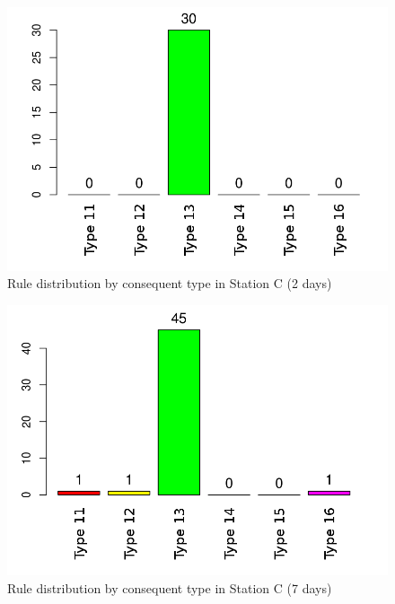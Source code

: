 \begin{figure}[hbtp]
\includegraphics[width=\textwidth]{img/conseqtypes_seg2.png}
\caption{Rule distribution by consequent type in Station C (2 days)} \label{fig:conseqtypes_seg2}
\end{figure}

\begin{figure}[hbtp]
\includegraphics[width=\textwidth]{img/conseqtypes_seg7.png}
\caption{Rule distribution by consequent type in Station C (7 days)} \label{fig:conseqtypes_seg7}
\end{figure}

